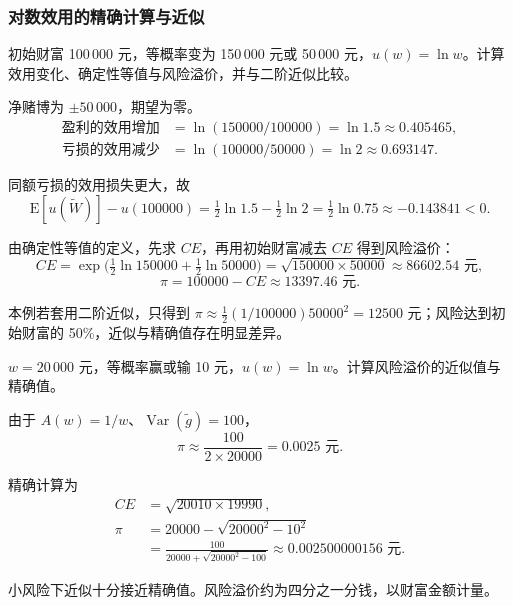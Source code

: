 \subsubsection{对数效用的精确计算与近似}
\begin{tcolorbox}[example,title=课堂例题：对数效用下的大风险]
\begin{question}
初始财富 100\,000 元，等概率变为 150\,000 元或 50\,000 元，$u(w)=\ln w$。计算效用变化、确定性等值与风险溢价，并与二阶近似比较。
\end{question}
\begin{solution}[blank-type=manual,blank-vsep=5\baselineskip]
净赌博为 $\pm50\,000$，期望为零。
\[
\begin{aligned}
 \text{盈利的效用增加}&=\ln(150000/100000)=\ln1.5\approx0.405465,\\
 \text{亏损的效用减少}&=\ln(100000/50000)=\ln2\approx0.693147.
\end{aligned}
\]

同额亏损的效用损失更大，故
\[
 \mathrm E[u(\widetilde W)]-u(100000)
 =\tfrac12\ln1.5-\tfrac12\ln2
 =\tfrac12\ln0.75\approx-0.143841<0.
\]

由确定性等值的定义，先求 $CE$，再用初始财富减去 $CE$ 得到风险溢价：
\[
 CE=\exp\bigl(\tfrac12\ln150000+\tfrac12\ln50000\bigr)
 =\sqrt{150000\times50000}\approx86602.54\text{ 元},
\]
\[
 \pi=100000-CE\approx13397.46\text{ 元}.
\]

本例若套用二阶近似，只得到 $\pi\approx\tfrac12(1/100000)50000^2=12500$ 元；风险达到初始财富的 50\%，近似与精确值存在明显差异。

\end{solution}
\end{tcolorbox}

\begin{tcolorbox}[example,title=课堂例题：对数效用下的小风险]
\begin{question}
 $w=20\,000$ 元，等概率赢或输 10 元，$u(w)=\ln w$。计算风险溢价的近似值与精确值。
\end{question}
\begin{solution}[blank-type=manual,blank-vsep=4\baselineskip]
由于 $A(w)=1/w$、$\operatorname{Var}(\tilde g)=100$，
\[
 \pi\approx\frac{100}{2\times20000}=0.0025\text{ 元}.
\]

精确计算为
\[
\begin{aligned}
 CE&=\sqrt{20010\times19990},\\
 \pi&=20000-\sqrt{20000^2-10^2}\\
 &=\frac{100}{20000+\sqrt{20000^2-100}}
 \approx0.002500000156\text{ 元}.
\end{aligned}
\]

小风险下近似十分接近精确值。风险溢价约为四分之一分钱，以财富金额计量。
\end{solution}
\end{tcolorbox}

